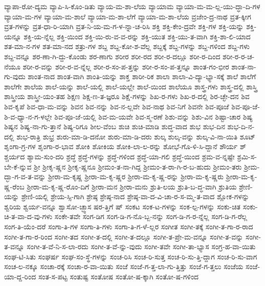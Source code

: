 {ವ್ಯಾಪಾ-ರೋ-ದ್ಯಮ
ವ್ಯಾಪಿ-ಸಿ-ಕೊಂ-ಡಿತು
ವ್ಯಾಯ-ಮ-ಶಾ-ಲೆಯ
ವ್ಯಾಯಾಮ
ವ್ಯಾಯಾ-ಮ-ಮ-ಲ್ಲ-ಯು-ದ್ಧಾ-ದಿ-ಗಳ
ವ್ಯಾಯಾ-ಮ-ಗಳ
ವ್ಯಾಯಾ-ಮ-ಶಾಲೆ
ವ್ಯಾಯಾ-ಮ-ಶಾ-ಲೆಗೆ
ವ್ಯಾಯಾ-ಮ-ಶಾ-ಲೆಯ
ವ್ರಜೇಂ-ದ್ರ-ನಾಥ
ವ್ರತ-ಕ್ಕೀಗ
ವ್ರತ-ಗಳನ್ನು
ವ್ರತ-ಧಾ-ರಿ-ಯಾಗಿ
ವ್ರತ-ನಿ-ಯ-ಮ-ಗ-ಳ-ನ್ನಾ-ಚ-ರಿಸಿ
ಶಕ್ತಿ
ಶಕ್ತಿ-ಕೇಂ-ದ್ರವೇ
ಶಕ್ತಿ-ಗಳ
ಶಕ್ತಿ-ಯನ್ನು
ಶಕ್ತಿ-ಯನ್ನೂ
ಶಕ್ತಿ-ಯ-ನ್ನೆಲ್ಲ
ಶಕ್ತಿ-ಯಿಂದ
ಶಕ್ತಿ-ಯಿ-ರು-ವ-ವ-ರನ್ನು
ಶಕ್ತಿ-ಯುತ
ಶಕ್ತಿ-ಯು-ತ-ವಾಗಿ
ಶಕ್ತಿ-ಶಾ-ಲಿ-ಯಾದ
ಶತ-ಮಾ-ನ-ಗಳ
ಶತ-ಮಾ-ನದ
ಶತ್ರು-ಗಳ
ಶಬ್ದ
ಶಬ್ದ-ಕೋ-ಶ-ವೆಲ್ಲ
ಶಬ್ದಕ್ಕೆ
ಶಬ್ದ-ಗಳನ್ನು
ಶಬ್ದ-ಗಳಿಂದ
ಶಬ್ದ-ಗಳು
ಶಬ್ದ-ವನ್ನೂ
ಶರ-ಣಾ-ಗಿ-ದ್ದು-ಕೊಂಡು
ಶರ-ಣಾಗು
ಶರೀರ
ಶರೀ-ರದ
ಶರೀ-ರ-ದಲ್ಲೂ
ಶರೀ-ರ-ದಿಂದ
ಶರೀ-ರ-ರ-ಚ-ನೆಯೂ
ಶರೀ-ರ-ವನ್ನು
ಶರೀ-ರ-ವ-ನ್ನೆಲ್ಲ
ಶರೀ-ರ-ಸಂ-ಪ-ತ್ತನ್ನು
ಶರೀ-ರ-ಸಂ-ಪ-ತ್ತನ್ನೂ
ಶಾಂತ-ಗಂ-ಭೀರ
ಶಾಂತ-ನಾ-ಗು-ವುದು
ಶಾಂತ-ನಾದ
ಶಾಂತ-ವಾಗಿ
ಶಾಂತಿ-ಯನ್ನು
ಶಾಕ್ತ
ಶಾರೀ-ರಿಕ
ಶಾಲಾ
ಶಾಲಾ-ವಿ-ದ್ಯಾ-ಭ್ಯಾ-ಸಕ್ಕೆ
ಶಾಲೆ
ಶಾಲೆಗೆ
ಶಾಲೆಗೇ
ಶಾಲೆಯ
ಶಾಲೆ-ಯನ್ನು
ಶಾಲೆ-ಯಲ್ಲಿ
ಶಾಲೆ-ಯಲ್ಲೇ
ಶಾಲೆ-ಯಿಂದ
ಶಾಲೆಯೂ
ಶಾಸ್ತ್ರ-ಗಳು
ಶಾಸ್ತ್ರ-ದಲ್ಲಿ
ಶಾಸ್ತ್ರಿ
ಶಾಸ್ತ್ರೀಯ
ಶಾಸ್ತ್ರೀ-ಯಂ-ತಹ
ಶಿಕ್ಷಣ
ಶಿಕ್ಷ-ಣ-ತ-ಜ್ಞರೂ
ಶಿಕ್ಷೆ-ಗಳನ್ನು
ಶಿಖ-ರ-ಗಳು
ಶಿಖ-ರ-ದಲ್ಲಿ
ಶಿರ-ಚ್ಛೇ-ದನ
ಶಿವ
ಶಿವ-ಕೃಪೆ
ಶಿವ-ಧಾ-ಮ-ವನ್ನು
ಶಿವನ
ಶಿವ-ನನ್ನು
ಶಿವ-ನ-ಲ್ಲವೇ
ಶಿವ-ನಾಥ
ಶಿವ-ನಿಗೆ
ಶಿವನೇ
ಶಿವ-ಪೂಜೆ
ಶಿವ-ಪೂ-ಜೆ-ಶಿ-ವ-ಧ್ಯಾ-ನ-ಗ-ಳಲ್ಲೇ
ಶಿವ-ಪೂ-ಜೆ-ಯಲ್ಲಿ
ಶಿವ-ಮ-ಯವೇ
ಶಿವ-ಸ್ಮ-ರಣೆ
ಶಿಶು-ವನ್ನು
ಶಿಶು-ವಿನ
ಶಿಷ್ಟಾ-ಚಾರ
ಶಿಷ್ಯ
ಶಿಷ್ಯನ
ಶಿಷ್ಯ-ನಾ-ಗು-ತ್ತಾನೆ
ಶಿಷ್ಯ-ರಿಗೂ
ಶೀಲ-ವೆಂಬ
ಶುಚಿ
ಶುಚಿ-ಮಾಡಿ
ಶುದ್ಧ-ವಾದ
ಶುಭ
ಶುಭ-ದಿನ
ಶುಭ-ದಿ-ನ-ದಲ್ಲಿ
ಶುಭ-ರಾತ್ರಿ
ಶುಭ್ರ
ಶುರು-ಮಾ-ಡಿ-ದನೋ
ಶುರು-ಮಾ-ಡಿ-ದರು
ಶುಲ್ಕ
ಶುಲ್ಕ-ವನ್ನು
ಶುಲ್ಕ-ವಿ-ನಾ-ಯಿತಿ
ಶೂಟ್
ಶೃಂಗಾ-ಗ್ರ-ಗಳ
ಶೃಂಗಾ-ರ-ಭಾವ
ಶೋಕಿ
ಶೋಕಿಯ
ಶೋಕಿ-ಲಾ-ಲ-ರನ್ನು
ಶೋಭೆ-ಗೊ-ಳಿ-ಸಿ-ದ್ದಾನೆ
ಶೌರ್ಯ
ಶ್
ಶ್ಚರ್ಯದ
ಶ್ಯಾಮ-ಸುಂ-ದರಿ
ಶ್ರದ್ಧೆ
ಶ್ರದ್ಧೆ-ಗಳನ್ನು
ಶ್ರದ್ಧೆ-ಗಳಿಂದ
ಶ್ರದ್ಧೆ-ಯಾ-ಗಲಿ
ಶ್ರದ್ಧೆ-ಯಿಂದ
ಶ್ರಮ-ವ-ನ್ನಷ್ಟೇ
ಶ್ರಮಿ-ಸ-ಬೇ-ಕೆ-ನ್ನುವ
ಶ್ರೀ
ಶ್ರೀಕೃ-ಷ್ಣನ
ಶ್ರೀಕೃ-ಷ್ಣನೂ
ಶ್ರೀಮಂ-ತ-ನಾ-ಗಿದ್ದ
ಶ್ರೀಮಂ-ತ-ರಾ-ಗಿ-ರ-ಬ-ಹುದು
ಶ್ರೀಮಂ-ತರು
ಶ್ರೀಮ-ದ್ಭಾ-ಗ-ವ-ತ-ವನ್ನು
ಶ್ರೀರಾ-ಮ-ಕೃಷ್ಣ
ಶ್ರೀರಾ-ಮ-ಕೃ-ಷ್ಣರ
ಶ್ರೀರಾ-ಮ-ಕೃ-ಷ್ಣ-ರನ್ನು
ಶ್ರೀರಾ-ಮ-ಕೃ-ಷ್ಣರು
ಶ್ರೀರಾ-ಮ-ಕೃ-ಷ್ಣ-ರೆಂಬ
ಶ್ರೀರಾ-ಮ-ಕೃ-ಷ್ಣ-ರೊಂ-ದಿಗೆ
ಶ್ರೀರಾ-ಮನ
ಶ್ರೀರಾ-ಮನು
ಶ್ರುತಿ-ಲಯ
ಶ್ರುತಿ-ಬ-ದ್ಧ-ವಾಗಿ
ಶ್ರುತಿಯ
ಶ್ರೇಣಿ-ಯನ್ನು
ಶ್ರೇಣಿ-ಯಲ್ಲಿ
ಶ್ರೇಯ-ಸ್ಸಿ-ಗಾಗಿ
ಶ್ರೇಷ್ಠ
ಶ್ರೇಷ್ಠ-ನಾದ
ಶ್ರೇಷ್ಠ-ವಾ-ದ-ವಿ-ಚಾ-ರ-ಸ-ಮ್ಮ-ತ-ವಾದ
ಶ್ಲೋಕ-ಗಳನ್ನು
ಶ್ವರಿಯ
ಶ್ವರ್ಯ-ವನ್ನೂ
ಶ್ವಾಸೋ-ಚ್ಛ್ವಾಸ
ಷರ-ತ್ತಿಗೆ
ಷ್
ಸಂಕಟ
ಸಂಕ-ಟ-ಗಳನ್ನು
ಸಂಕ-ಲ್ಪ-ಗಳನ್ನು
ಸಂಕು-ಚಿತ
ಸಂಕು-ಚಿ-ತ-ವಾ-ದ-ವು-ಗಳು
ಸಂಕೇ-ತವೇ
ಸಂಗ-ಡಿಗ
ಸಂಗ-ಡಿ-ಗ-ನೊ-ಬ್ಬ-ನನ್ನು
ಸಂಗ-ಡಿ-ಗ-ರ-ನ್ನೆಲ್ಲ
ಸಂಗ-ಡಿ-ಗ-ರೆಲ್ಲ
ಸಂಗ-ತಿ-ಯೆಂ-ದರೆ
ಸಂಗಾ-ತಿ-ಗಳ
ಸಂಗಾ-ತಿ-ಗಳು
ಸಂಗಾ-ತಿ-ಗ-ಳೆ-ಲ್ಲರ
ಸಂಗೀತ
ಸಂಗೀ-ತಕ್ಕೆ
ಸಂಗೀ-ತ-ಗಾ-ರ-ರಾದ
ಸಂಗೀ-ತ-ಗಾ-ರ-ರಿಂದ
ಸಂಗೀ-ತದ
ಸಂಗೀ-ತ-ದಲ್ಲಿ
ಸಂಗೀ-ತ-ದಲ್ಲೂ
ಸಂಗೀ-ತ-ಪ್ರೇ-ಮ-ವನ್ನೂ
ಸಂಗೀ-ತ-ವನ್ನು
ಸಂಗೀ-ತ-ವನ್ನೂ
ಸಂಗೀ-ತ-ವೆ-ನಿ-ಸ-ಲಾ-ರದು
ಸಂಗೀ-ತ-ವೆ-ನ್ನು-ವುದು
ಸಂಗೀ-ತವೇ
ಸಂಗೀ-ತಾ-ಭ್ಯಾಸ
ಸಂಗ್ರ-ಹ-ವಾ-ಯಿತು
ಸಂಘ-ಟಿ-ಸಿತು
ಸಂಘರ್ಷ
ಸಂಘ-ಸಂ-ಸ್ಥೆ-ಗಳನ್ನು
ಸಂಚ-ರಿಸಿ
ಸಂಚ-ರಿ-ಸುತ್ತ
ಸಂಚ-ರಿ-ಸು-ತ್ತಿ-ದ್ದಾಗ
ಸಂಚ-ರಿ-ಸು-ವಾಗ
ಸಂಚ-ಲ-ನಕ್ಕೂ
ಸಂಚಾ-ರಕ್ಕೆ
ಸಂಚಾ-ರ-ವಾ-ಯಿತು
ಸಂಜೆ
ಸಂಜೆ-ಗ-ತ್ತ-ಲಾ-ಗು-ತ್ತಿತ್ತು
ಸಂಜೆ-ಗ-ತ್ತಲು
ಸಂಜೆಯ
ಸಂಜೆ-ಯಾ-ದ್ದ-ರಿಂದ
ಸಂತ-ಸ-ಪಟ್ಟ
ಸಂತುಷ್ಟ
ಸಂತೋಷ
ಸಂತೋ-ಷ-ಕ್ಕಾಗಿ
ಸಂತೋ-ಷ-ಗಳಿಂದ
}
